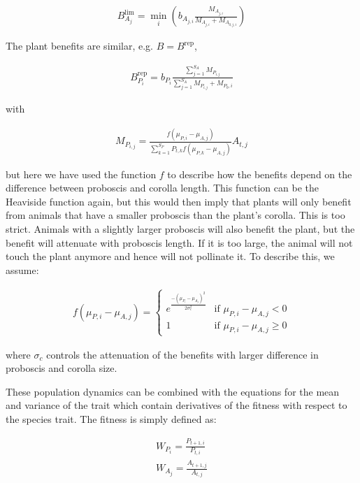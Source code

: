 \documentclass[a4paper,12pt]{article}
\begin{document}
\begin{align}
B^\mathrm{lim}_{A_j} = \min_i \left( b_{A_{j,i}} \frac{M_{A_{j,i}}}{M_{A_{j,i}} + M_{A_{0,j,i}}} \right)
\end{align}

The plant benefits are similar, e.g. $B = B^\mathrm{rep}$,

\begin{align}
B^\mathrm{rep}_{P_i} = b_{P_i} \frac{\sum^{S_A}_{j = 1} M_{P_{i,j}}}{\sum^{S_A}_{j = 1} M_{P_{i,j}} + M_{P_0,i}}
\end{align}

\noindent with

\begin{align}
    M_{P_{i,j}} = \frac{ f(\mu_{P,i} - \mu_{A,j}) }{\sum^{S_P}_{k = 1} P_{t,k} f(\mu_{P,k} - \mu_{A,j}) } A_{t,j}  
\end{align}

\noindent but here we have used the function $f$ to describe how the benefits depend on the difference between proboscis and corolla length. This function can be the Heaviside function again, but this would then imply that plants will only benefit from animals that have a smaller proboscis than the plant's corolla. This is too strict. Animals with a slightly larger proboscis will also benefit the plant, but the benefit will attenuate with proboscis length. If it is too large, the animal will not touch the plant anymore and hence will not pollinate it. To describe this, we assume:

\begin{align}
    f(\mu_{P,i} - \mu_{A,j}) = \begin{cases}
e^{\frac{-(\mu_{P_i} - \mu_{A_j})^2}{2 \sigma_c^2}} & \text{if } \mu_{P,i} - \mu_{A,j} < 0 \\
1 & \text{if } \mu_{P,i} - \mu_{A,j} \geq 0
\end{cases}
\end{align}

\noindent where $\sigma_c$ controls the attenuation of the benefits with larger difference in proboscis and corolla size.

These population dynamics can be combined with the equations for the mean and variance of the trait which contain derivatives of the fitness with respect to the species trait. The fitness is simply defined as:

\begin{align}
    W_{P_i} = \frac{P_{t+1,i}}{P_{t,i}} \\
    W_{A_j} = \frac{A_{t+1,j}}{A_{t,j}} 
\end{align}
\end{document}
